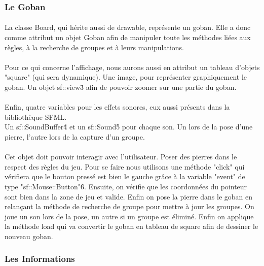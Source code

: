     	   \subsubsection{Le Goban}
                \paragraph{}La classe Board, qui hérite aussi de drawable, représente un goban. Elle a donc comme attribut un objet Goban afin de manipuler toute les méthodes liées aux règles, à la recherche de groupes et à leurs manipulations.
                
    	        \paragraph{}Pour ce qui concerne l'affichage, nous aurons aussi en attribut un tableau d'objets "square" (qui sera dynamique). Une image, pour représenter graphiquement le goban. Un objet sf::view\^3 afin de pouvoir zoomer sur une partie du goban. 
    	        
    	        \paragraph{}Enfin, quatre variables pour les effets sonores, eux aussi présents dans la bibliothèque SFML.\\
                Un sf::SoundBuffer\^4 et un sf::Sound\^5 pour chaque son. Un lors de la pose d'une pierre, l'autre lors de la capture d'un groupe. 
                
                \paragraph{}Cet objet doit pouvoir interagir avec l'utilisateur. Poser des pierres dans le respect des règles du jeu. Pour se faire nous utilisons une méthode "click" qui vérifiera que le bouton pressé est bien le gauche grâce à la variable "event" de type "sf::Mouse::Button"\^6. Ensuite, on vérifie que les coordonnées du pointeur sont bien dans la zone de jeu et valide. Enfin on pose la pierre dans le goban en relançant la méthode de recherche de groupe pour mettre à jour les groupes. On joue un son lors de la pose, un autre si un groupe est éliminé. Enfin on applique la méthode load qui va convertir le goban en tableau de square afin de dessiner le nouveau goban.
                
            \subsubsection{Les Informations}
